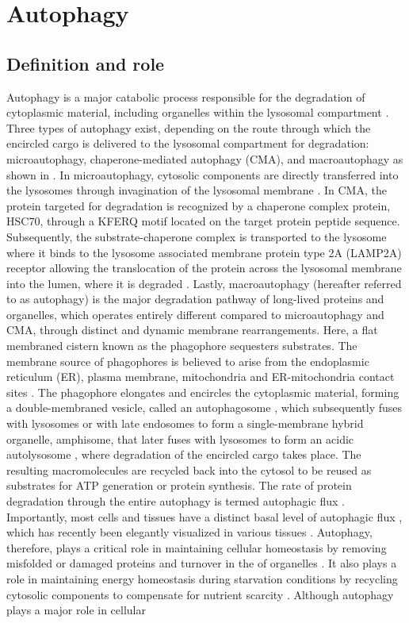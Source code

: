 \section{Autophagy}
\subsection{Definition and role}
Autophagy is a major catabolic process responsible for the degradation of cytoplasmic material, including organelles within the lysosomal compartment \citep{He2009,Nixon2011}. Three types of autophagy exist, depending on the route through which the encircled cargo is delivered to the lysosomal compartment for degradation: microautophagy, chaperone-mediated autophagy (CMA), and macroautophagy \citep{Boya2013} as shown in . In microautophagy, cytosolic components are directly transferred into the lysosomes through invagination of the lysosomal membrane \citep{Cai2012,Nixon2011}. In CMA, the protein targeted for degradation is recognized by a chaperone complex protein, HSC70, through a KFERQ motif located on the target protein peptide sequence. Subsequently, the substrate-chaperone complex is transported to the lysosome where it binds to the lysosome associated membrane protein type 2A (LAMP2A) receptor allowing the translocation of the protein across the lysosomal membrane into the lumen, where it is degraded \citep{Cuervo2014,Dice2007,Klionsky2010}. Lastly, macroautophagy (hereafter referred to as autophagy) is the major degradation pathway of long-lived proteins and organelles, which operates entirely different compared to microautophagy and CMA, through distinct and dynamic membrane rearrangements. Here, a flat membraned cistern known as the phagophore sequesters substrates. The membrane source of phagophores is believed to arise from the  endoplasmic reticulum (ER), plasma membrane, mitochondria and ER-mitochondria contact sites \citep{Hailey2010,Hamasaki2013,Hayashi-Nishino2009,Ravikumar2010,sarkar2013,Yla-Anttila2009}. The phagophore elongates and encircles the cytoplasmic material, forming a double-membraned vesicle, called an autophagosome \citep{Cai2012,Levine2008}, which subsequently fuses with lysosomes or with late endosomes to form a single-membrane hybrid organelle, amphisome, that later fuses with lysosomes to form an acidic autolysosome \citep{Cai2012,Nixon2011,sarkar2013}, where degradation of the encircled cargo takes place. The resulting macromolecules are recycled back into the cytosol to be reused as substrates for ATP generation or protein synthesis. The rate of protein degradation through the entire autophagy is termed autophagic flux \citep{klionsky2016,loos2014}. Importantly, most cells and tissues have a distinct basal level of autophagic flux \citep{Mizushima2004a}, which has recently been elegantly visualized in various tissues \citep{Kaizuka2016}.  Autophagy, therefore, plays a critical role in maintaining cellular homeostasis by removing misfolded or damaged proteins and turnover in the of organelles \citep{Levine2008}. It also plays a role in maintaining energy homeostasis during starvation conditions by recycling cytosolic components to compensate for nutrient scarcity \citep{Levine2008,Loos2009}. Although autophagy plays a major role in cellular 